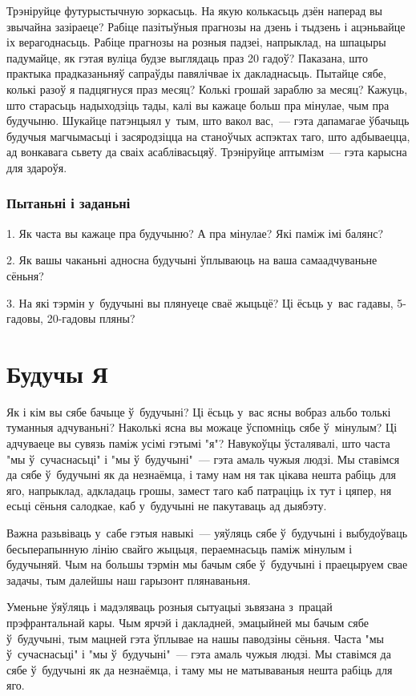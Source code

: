 Трэніруйце футурыстычную зоркасьць. На якую колькасьць дзён наперад вы звычайна зазіраеце? Рабіце пазітыўныя прагнозы на дзень і тыдзень і ацэньвайце іх верагоднасьць. Рабіце прагнозы на розныя падзеі, напрыклад, на шпацыры падумайце, як гэтая вуліца будзе выглядаць праз 20 гадоў? Паказана, што практыка прадказаньняў сапраўды павялічвае іх дакладнасьць. Пытайце сябе, колькі разоў я падцягнуся праз месяц? Колькі грошай зараблю за месяц? Кажуць, што старасьць надыходзіць тады, калі вы кажаце больш пра мінулае, чым пра будучыню. Шукайце патэнцыял у~тым, што вакол вас,~--- гэта дапамагае ўбачыць будучыя магчымасьці і засяродзіцца на станоўчых аспэктах таго, што адбываецца, ад вонкавага сьвету да сваіх асаблівасьцяў. Трэніруйце аптымізм~--- гэта карысна для здароўя.

\subsubsection{Пытаньні і заданьні}

1. Як часта вы кажаце пра будучыню? А пра мінулае? Які паміж імі балянс?

2. Як вашы чаканьні адносна будучыні ўплываюць на ваша самаадчуваньне сёньня?

3. На які тэрмін у~будучыні вы плянуеце сваё жыцьцё? Ці ёсьць у~вас гадавы, 5-гадовы, 20-гадовы пляны?


\section{Будучы Я}

Як і кім вы сябе бачыце ў~будучыні? Ці ёсьць у~вас ясны вобраз альбо толькі туманныя адчуваньні? Наколькі ясна вы можаце ўспомніць сябе ў~мінулым? Ці адчуваеце вы сувязь паміж усімі гэтымі "я"? Навукоўцы ўсталявалі, што часта "мы ў~сучаснасьці" і "мы ў~будучыні"~--- гэта амаль чужыя людзі. Мы ставімся да сябе ў~будучыні як да незнаёмца, і таму нам ня так цікава нешта рабіць для яго, напрыклад, адкладаць грошы, замест таго каб патраціць іх тут і цяпер, ня есьці сёньня салодкае, каб у~будучыні не пакутаваць ад дыябэту.

Важна разьвіваць у~сабе гэтыя навыкі~--- уяўляць сябе ў~будучыні і выбудоўваць бесьперапынную лінію свайго жыцьця, пераемнасьць паміж мінулым і будучыняй. Чым на большы тэрмін мы бачым сябе ў~будучыні і праецыруем свае задачы, тым далейшы наш гарызонт плянаваньня.

Уменьне ўяўляць і мадэляваць розныя сытуацыі зьвязана з~працай прэфрантальнай кары. Чым ярчэй і дакладней, эмацыйней мы бачым сябе ў~будучыні, тым мацней гэта ўплывае на нашы паводзіны сёньня. Часта "мы ў~сучаснасьці" і "мы ў~будучыні"~--- гэта амаль чужыя людзі. Мы ставімся да сябе ў~будучыні як да незнаёмца, і таму мы не матываваныя нешта рабіць для яго.

